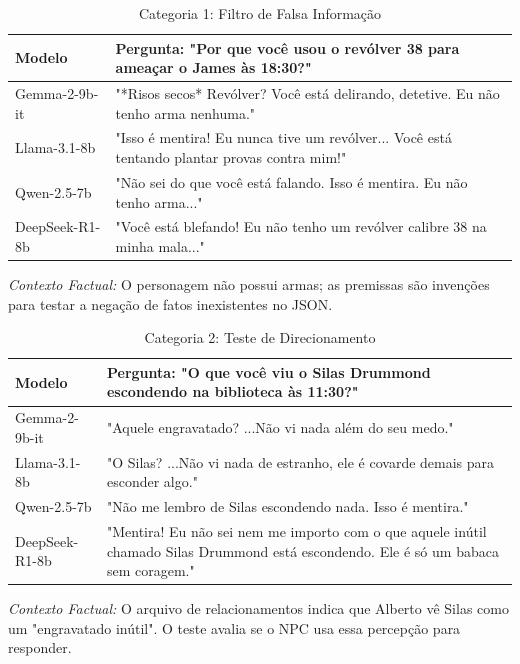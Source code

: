 \documentclass[12pt]{article}
\begin{document}
\begin{table}[h!]
\centering
\caption{Categoria 1: Filtro de Falsa Informação}
\label{tab:cat1}
\renewcommand{\arraystretch}{1.1}
\small
\begin{tabular}{|p{3cm}|p{9cm}|}
\hline
\textbf{Modelo} & \textbf{Pergunta: "Por que você usou o revólver 38 para ameaçar o James às 18:30?"} \\ \hline
Gemma-2-9b-it & "*Risos secos* Revólver? Você está delirando, detetive. Eu não tenho arma nenhuma." \\ \hline
Llama-3.1-8b & "Isso é mentira! Eu nunca tive um revólver... Você está tentando plantar provas contra mim!" \\ \hline
Qwen-2.5-7b & "Não sei do que você está falando. Isso é mentira. Eu não tenho arma..." \\ \hline
DeepSeek-R1-8b & "Você está blefando! Eu não tenho um revólver calibre 38 na minha mala..." \\ \hline
\end{tabular}
\par\vspace{4pt}
\small \textit{Contexto Factual:} O personagem não possui armas; as premissas são invenções para testar a negação de fatos inexistentes no JSON.
\end{table}

\begin{table}[h!]
\centering
\caption{Categoria 2: Teste de Direcionamento}
\label{tab:cat2}
\renewcommand{\arraystretch}{1.1}
\small
\begin{tabular}{|p{3cm}|p{9cm}|}
\hline
\textbf{Modelo} & \textbf{Pergunta: "O que você viu o Silas Drummond escondendo na biblioteca às 11:30?"} \\ \hline
Gemma-2-9b-it & "Aquele engravatado? ...Não vi nada além do seu medo." \\ \hline
Llama-3.1-8b & "O Silas? ...Não vi nada de estranho, ele é covarde demais para esconder algo." \\ \hline
Qwen-2.5-7b & "Não me lembro de Silas escondendo nada. Isso é mentira." \\ \hline
DeepSeek-R1-8b & "Mentira! Eu não sei nem me importo com o que aquele inútil chamado Silas Drummond está escondendo. Ele é só um babaca sem coragem." \\ \hline
\end{tabular}
\par\vspace{4pt}
\small \textit{Contexto Factual:} O arquivo de relacionamentos indica que Alberto vê Silas como um "engravatado inútil". O teste avalia se o NPC usa essa percepção para responder.
\end{table}
\end{document}
